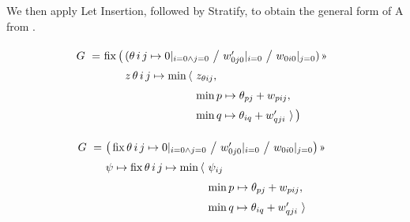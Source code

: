 We then apply Let Insertion, followed by Stratify, to obtain the general form of A from .

\begin{center}
\end{center}

\begin{equation}
  \renewcommand\arraystretch{1.5}
  \begin{array}{@{}l@{}l@{}l@{}l@{}}
    G ~=~ & \fix \big(\,& \lspan2{(\theta\,i\,j\mapsto 0|_{i=0\land j=0} ~\big/~ w'_{0j0}|_{i=0} ~\big/~ w_{0i0}|_{j=0})\applt} \\
	      & & z\,\theta\,i\,j \mapsto \min\,\langle~& z_{\theta ij}, \\
	      & & & \min p\mapsto\theta_{pj}+w_{pij}, \\
	      & & & \min q\mapsto\theta_{iq}+w'_{qji} ~\rangle\,\big)
  \end{array}
\end{equation}

\begin{center}
\end{center}

\begin{equation}
  \renewcommand\arraystretch{1.5}
  \begin{array}{@{}l@{}l@{}l@{}}
    G ~=~ & \lspan2{\big(\fix \theta\,i\,j\mapsto
	              0|_{i=0\land j=0} ~\big/~ w'_{0j0}|_{i=0} ~\big/~ w_{0i0}|_{j=0}\big)\applt} \\
	      & \psi\mapsto \fix \theta\,i\,j\mapsto\min\,\langle~ & \psi_{ij} \\
	      & & \min p\mapsto\theta_{pj}+w_{pij}, \\
	      & & \min q\mapsto\theta_{iq}+w'_{qji} ~\rangle
  \end{array}
\end{equation}

